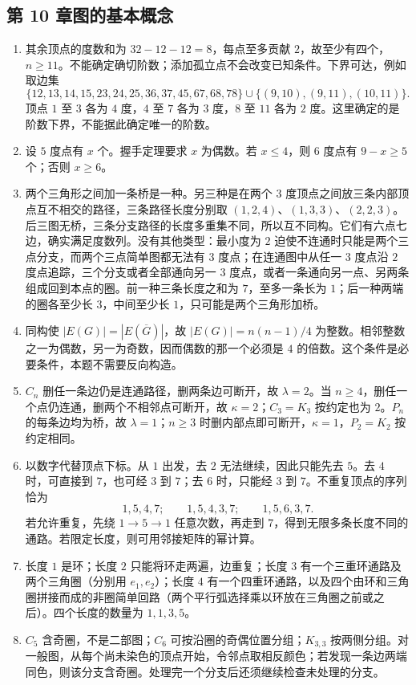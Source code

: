 \documentclass[UTF8,fontset=none,zihao=-4,a4paper]{ctexart}
\begin{document}
\subsection*{第 10 章\quad 图的基本概念}
\begin{enumerate}[label=10.\arabic*.,leftmargin=2.8em]
\item 其余顶点的度数和为 $32-12-12=8$，每点至多贡献 $2$，故至少有四个，$n\ge11$。不能确定确切阶数；添加孤立点不会改变已知条件。下界可达，例如取边集
\[
\{12,13,14,15,23,24,25,36,37,45,67,68,78\}
\cup\{(9,10),(9,11),(10,11)\}.
\]
顶点 $1$ 至 $3$ 各为 $4$ 度，$4$ 至 $7$ 各为 $3$ 度，$8$ 至 $11$ 各为 $2$ 度。这里确定的是阶数下界，不能据此确定唯一的阶数。

\item 设 $5$ 度点有 $x$ 个。握手定理要求 $x$ 为偶数。若 $x\le4$，则 $6$ 度点有 $9-x\ge5$ 个；否则 $x\ge6$。

\item 两个三角形之间加一条桥是一种。另三种是在两个 $3$ 度顶点之间放三条内部顶点互不相交的路径，三条路径长度分别取 $(1,2,4)$、$(1,3,3)$、$(2,2,3)$。后三图无桥，三条分支路径的长度多重集不同，所以互不同构。它们有六点七边，确实满足度数列。没有其他类型：最小度为 $2$ 迫使不连通时只能是两个三点分支，而两个三点简单图都无法有 $3$ 度点；在连通图中从任一 $3$ 度点沿 $2$ 度点追踪，三个分支或者全部通向另一 $3$ 度点，或者一条通向另一点、另两条组成回到本点的圈。前一种三条长度之和为 $7$，至多一条长为 $1$；后一种两端的圈各至少长 $3$，中间至少长 $1$，只可能是两个三角形加桥。

\item 同构使 $|E(G)|=|E(\overline G)|$，故 $|E(G)|=n(n-1)/4$ 为整数。相邻整数之一为偶数，另一为奇数，因而偶数的那一个必须是 $4$ 的倍数。这个条件是必要条件，本题不需要反向构造。

\item $C_n$ 删任一条边仍是连通路径，删两条边可断开，故 $\lambda=2$。当 $n\ge4$，删任一个点仍连通，删两个不相邻点可断开，故 $\kappa=2$；$C_3=K_3$ 按约定也为 $2$。$P_n$ 的每条边均为桥，故 $\lambda=1$；$n\ge3$ 时删内部点即可断开，$\kappa=1$，$P_2=K_2$ 按约定相同。

\item 以数字代替顶点下标。从 $1$ 出发，去 $2$ 无法继续，因此只能先去 $5$。去 $4$ 时，可直接到 $7$，也可经 $3$ 到 $7$；去 $6$ 时，只能经 $3$ 到 $7$。不重复顶点的序列恰为
\[
1,5,4,7;\qquad 1,5,4,3,7;\qquad 1,5,6,3,7.
\]
若允许重复，先绕 $1\to5\to1$ 任意次数，再走到 $7$，得到无限多条长度不同的通路。若限定长度，则可用邻接矩阵的幂计算。

\item 长度 $1$ 是环；长度 $2$ 只能将环走两遍，边重复；长度 $3$ 有一个三重环通路及两个三角圈（分别用 $e_1,e_2$）；长度 $4$ 有一个四重环通路，以及四个由环和三角圈拼接而成的非圈简单回路（两个平行弧选择乘以环放在三角圈之前或之后）。四个长度的数量为 $1,1,3,5$。

\item $C_5$ 含奇圈，不是二部图；$C_6$ 可按沿圈的奇偶位置分组；$K_{3,3}$ 按两侧分组。对一般图，从每个尚未染色的顶点开始，令邻点取相反颜色；若发现一条边两端同色，则该分支含奇圈。处理完一个分支后还须继续检查未处理的分支。
\end{enumerate}
\end{document}
